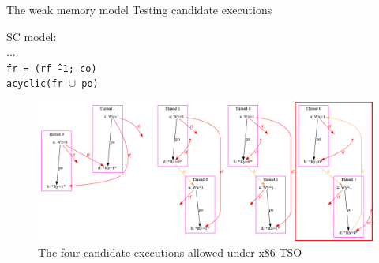 \documentclass{beamer}
\begin{document}
\begin{frame}{The weak memory model} {Testing candidate executions}
\vspace{10pt}
\begin{minipage}{.3\linewidth}
\hfill
\end{minipage}
%
\noindent\begin{minipage}{.4\linewidth}
\end{minipage}
%
\noindent\begin{minipage}{.25\linewidth}
\scriptsize
SC model: \\
... \\
\texttt{fr = (rf\^\,-1; co)} \\
\color{red}\texttt{acyclic(fr $\cup$ po)}
\end{minipage}
\vspace{-5pt}
\begin{figure}
\includegraphics[width=\linewidth]{img/candidate-red.png}
\caption{The four candidate executions allowed under x86-TSO}
\end{figure}

\end{frame}
\end{document}
